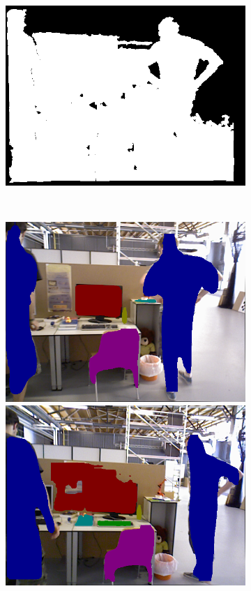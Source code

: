 \begin{figure}[!htbp]
\begin{subfigure}[b]{0.35\textwidth}
      \includegraphics[width=\textwidth]{Img/depth_63.png}
      \caption{}
      \label{fig:depth}
    \end{subfigure}%
    ~%
    \\%
    \begin{subfigure}[b]{0.35\textwidth}
        \includegraphics[width=\textwidth]{Img/mask_63.png}
        \includegraphics[width=\textwidth]{Img/mask_87.png}

\end{subfigure}
\end{figure}
